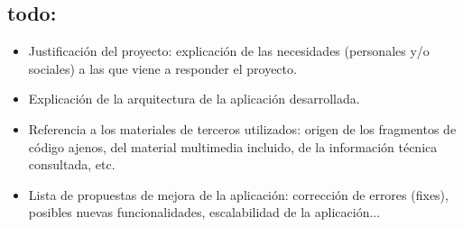 \subsection*{todo:}
\begin{itemize}
	\item{Justificación del proyecto: explicación de las necesidades (personales y/o
		sociales) a las que viene a responder el proyecto.}
	\item{Explicación de la arquitectura de la aplicación desarrollada.}
	\item{Referencia a los materiales de terceros utilizados: origen de los fragmentos de
		código ajenos, del material multimedia incluido, de la información técnica
		consultada, etc.}
	\item{Lista de propuestas de mejora de la aplicación: corrección de errores (fixes),
		posibles nuevas funcionalidades, escalabilidad de la aplicación...}
\end{itemize}

